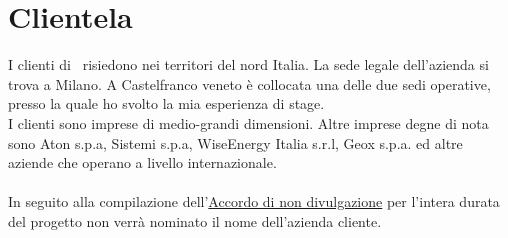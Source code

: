 \section{Clientela}
\label{cap1:Clientela}
I clienti di \azienda\ risiedono nei territori del nord Italia. La sede legale dell'azienda si trova a Milano. A Castelfranco veneto è collocata una delle due sedi operative, presso la quale ho svolto la mia esperienza di stage.\\
I clienti sono imprese di medio-grandi dimensioni. Altre imprese degne di nota sono Aton s.p.a, Sistemi s.p.a, WiseEnergy Italia s.r.l, Geox s.p.a. ed altre aziende che operano a livello internazionale.

\paragraph*{}In seguito alla compilazione dell'\hyperref[NDA]{Accordo di non divulgazione} per l'intera durata del progetto non verrà nominato il nome dell'azienda cliente.

\newpage
